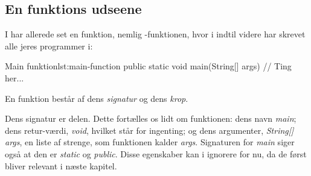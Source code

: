 \iffalse%

	For eksempel: Hvis vi har skrevet noget kode som beregner faktorialet af
	\(10\), som vi har gjort i listing~\ref{lst:factorial-of-10}. Men hvis vi
	også gerne ville beregne faktorialet af \(20\) skulle vi kopiere koden og
	ærstatte \(10\) med \(20\). Alternativt kunne vi lave en funktion, som
	beregner faktorialet for et hvilkårligt tal, og giver os svaret.

	\begin{JavaCode}{Kode som beregner faktorialet af \(10\) og viser det.}{lst:factorial-of-10}
		int a = 1;
		for (int i = 1; i <= 10; i++)
			a = a * i;
		System.out.println(a);
	\end{JavaCode}

	\todo{Snak om Java-filer og deres forhold til funktioner.}

	\begin{JavaCode}{Java-fil med fakultet funktion og main}{lst:factorial-with-main}
	class Factorial {

		public int factorial (int n) {
			int a = 1;
			for (int i = 1; i <= n; i++)
				a = a * i;
			return a;
		}

		public static void main(String[] args) {
			int fac_of_10 = factorial(10);
			int fac_of_20 = factorial(20);
		}

	}
	\end{JavaCode}

\fi

	\subsection{En funktions udseene}

	I har allerede set en funktion, nemlig -funktionen, hvor i
	indtil videre har skrevet alle jeres programmer i:

	\begin{JavaCode}{Main funktion}{lst:main-function}
		public static void main(String[] args) {
			// Ting her...
		}
	\end{JavaCode}

	En funktion består af dens \emph{signatur} og dens \emph{krop}.

	Dens signatur er  delen.
	Dette fortælles os lidt om funktionen: dens navn \emph{main}; dens
	retur-værdi, \emph{void}, hvilket står for ingenting; og dens argumenter,
	\emph{String[] args}, en liste af strenge, som funktionen kalder \emph{args}.
	Signaturen for \emph{main} siger også at den er \emph{static} og
	\emph{public}. Disse egenskaber kan i ignorere for nu, da de først bliver
	relevant i næste kapitel.

